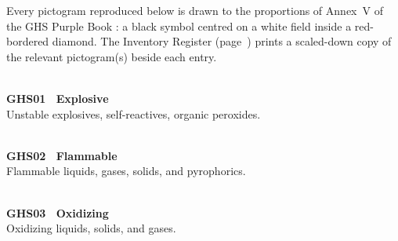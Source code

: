 

\noindent\small Every pictogram reproduced below is drawn to the proportions of Annex~V of
the GHS Purple Book \cite{ghs2023}: a black symbol centred on a white field inside a
red-bordered diamond. The Inventory Register (page~\pageref{sec:register}) prints a
scaled-down copy of the relevant pictogram(s) beside each entry.

\vspace{6pt}
\noindent
\begin{minipage}[t]{0.31\linewidth}\vspace{0pt}
\centering \ghsExplosive{1.6cm} \\[3pt]
{\bfseries\color{hazardred}GHS01 \textbullet\ Explosive} \\[1pt]
{\footnotesize Unstable explosives, self-reactives, organic peroxides.}
\end{minipage}%
\hfill
\begin{minipage}[t]{0.31\linewidth}\vspace{0pt}
\centering \ghsFlammable{1.6cm} \\[3pt]
{\bfseries\color{hazardred}GHS02 \textbullet\ Flammable} \\[1pt]
{\footnotesize Flammable liquids, gases, solids, and pyrophorics.}
\end{minipage}%
\hfill
\begin{minipage}[t]{0.31\linewidth}\vspace{0pt}
\centering \ghsOxidizer{1.6cm} \\[3pt]
{\bfseries\color{hazardred}GHS03 \textbullet\ Oxidizing} \\[1pt]
{\footnotesize Oxidizing liquids, solids, and gases.}
\end{minipage}

\par\vspace{10pt}

